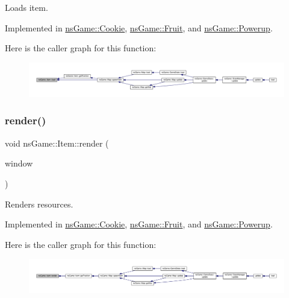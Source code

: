 Loads item. 



Implemented in \hyperlink{classns_game_1_1_cookie_a20769adf2b327f4bf519e851073b1891}{ns\+Game\+::\+Cookie}, \hyperlink{classns_game_1_1_fruit_a28c4ae21607dbad699602528c6ffc583}{ns\+Game\+::\+Fruit}, and \hyperlink{classns_game_1_1_powerup_a2a228e8f89bed454ad8011dfd88068c6}{ns\+Game\+::\+Powerup}.

Here is the caller graph for this function\+:\nopagebreak
\begin{figure}[H]
\begin{center}
\leavevmode
\includegraphics[width=350pt]{structns_game_1_1_item_a5887b6e9225ae8a276801225eca83808_icgraph}
\end{center}
\end{figure}
\mbox{\label{structns_game_1_1_item_a451b6491efc475c9ca47dcccdbbde707}} 
\subsubsection{\texorpdfstring{render()}{render()}}
{\footnotesize\ttfamily void ns\+Game\+::\+Item\+::render (\begin{DoxyParamCaption}\item[{Min\+GL \&}]{window }\end{DoxyParamCaption})\hspace{0.3cm}{\ttfamily [pure virtual]}}



Renders resources. 



Implemented in \hyperlink{classns_game_1_1_cookie_a7e321497bf9d9baa738d987e9c47dd5e}{ns\+Game\+::\+Cookie}, \hyperlink{classns_game_1_1_fruit_a99622754f8cf90bb285b4808e98372c7}{ns\+Game\+::\+Fruit}, and \hyperlink{classns_game_1_1_powerup_ad113cfd795157168c103b71560180201}{ns\+Game\+::\+Powerup}.

Here is the caller graph for this function\+:\nopagebreak
\begin{figure}[H]
\begin{center}
\leavevmode
\includegraphics[width=350pt]{structns_game_1_1_item_a451b6491efc475c9ca47dcccdbbde707_icgraph}
\end{center}
\end{figure}
\mbox{\label{structns_game_1_1_item_a96c07d0f91eef0d77e91d1a7397091a1}} 
